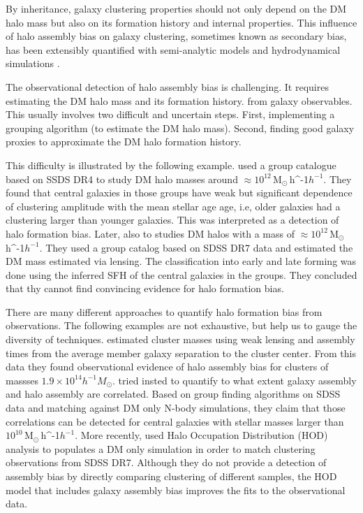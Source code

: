 \documentclass[fleqn,usenatbib]{mnras}
\newcommand{\Msunh}{\,{\rm M}$_{\odot}$\,\ifmmode h^{-1}\else $h^{-1}$\fi}
\begin{document}
By inheritance, galaxy clustering properties should not only depend on
the DM halo mass but also on its formation history and internal
properties.
This influence of halo assembly bias on galaxy clustering, sometimes known as
secondary bias, has been extensibly quantified with semi-analytic models 
\citep{2007MNRAS.374.1303C,2014ApJ...794...74J,2019MNRAS.484.1133C}
and hydrodynamical simulations
\citep{2018MNRAS.480.3978A,2020MNRAS.492.2739X,2020MNRAS.tmp.1844M}. 

The observational detection of halo assembly bias is challenging.
It requires estimating the DM halo mass and its formation history.
from galaxy observables.
This usually involves two difficult and uncertain steps.
First, implementing a grouping algorithm (to estimate the DM halo
mass). 
Second, finding good galaxy proxies to approximate the DM halo
formation history.   

This difficulty is illustrated by the following example.
\citet{Lacerna_2014} used a group catalogue based on SSDS DR4
to study DM halo masses around $\approx 10^{12}$\Msunh. 
They found that central galaxies in those groups have weak but
significant dependence of clustering amplitude with the mean stellar
age age, i.e, older galaxies had a clustering larger than younger
galaxies. This was interpreted as a detection of halo formation bias.
Later, \citet{2016ApJ...819..119L} also to studies DM halos with a
mass of $\approx 10^{12}$\Msunh. 
They used a group catalog based on SDSS DR7 data  and estimated the DM
mass estimated via lensing.
The classification into early and late forming was done using  the
inferred SFH of the central galaxies in the groups.  
They concluded that thy cannot find convincing evidence for halo
formation bias.  

There are many different approaches to quantify halo formation bias
from observations.
The following examples are not exhaustive, but help us to gauge the
diversity of techniques.
\citet{2016PhRvL.116d1301M} estimated cluster masses using weak lensing and
assembly times from the average member galaxy separation to the cluster center. 
From this data they found observational evidence of halo assembly bias
for clusters of massses $1.9\times 10^{14}h^{-1}M_\odot$.
\citet{2018MNRAS.478.4487T} tried insted to quantify to what extent
galaxy assembly and halo assembly are correlated.
Based on group finding algorithms on SDSS data and matching against DM only N-body simulations,
they claim that those correlations can be detected for central
galaxies with stellar masses larger than $10^{10}$\Msunh.
More recently, \citet{2019MNRAS.485.1196Z} used Halo Occupation
Distribution (HOD) analysis to populates a DM only simulation in order
to match clustering observations from SDSS DR7. 
Although they do not provide a detection of assembly bias by directly
comparing clustering of different samples, 
the HOD model that includes galaxy assembly bias improves the fits to
the observational data. 
\end{document}
